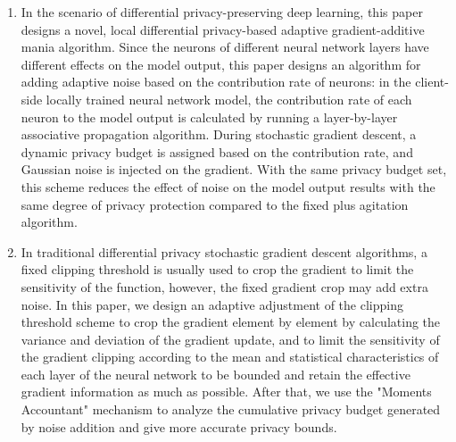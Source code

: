 \begin{enumerate}
	\item In the scenario of differential privacy-preserving deep learning, this paper designs a novel, local differential privacy-based adaptive gradient-additive mania algorithm. Since the neurons of different neural network layers have different effects on the model output, this paper designs an algorithm for adding adaptive noise based on the contribution rate of neurons: in the client-side locally trained neural network model, the contribution rate of each neuron to the model output is calculated by running a layer-by-layer associative propagation algorithm. During stochastic gradient descent, a dynamic privacy budget is assigned based on the contribution rate, and Gaussian noise is injected on the gradient. With the same privacy budget set, this scheme reduces the effect of noise on the model output results with the same degree of privacy protection compared to the fixed plus agitation algorithm.

	\item In traditional differential privacy stochastic gradient descent algorithms, a fixed clipping threshold is usually used to crop the gradient to limit the sensitivity of the function, however, the fixed gradient crop may add extra noise. In this paper, we design an adaptive adjustment of the clipping threshold scheme to crop the gradient element by element by calculating the variance and deviation of the gradient update, and to limit the sensitivity of the gradient clipping according to the mean and statistical characteristics of each layer of the neural network to be bounded and retain the effective gradient information as much as possible. After that, we use the "Moments Accountant" mechanism to analyze the cumulative privacy budget generated by noise addition and give more accurate privacy bounds.


\end{enumerate}
